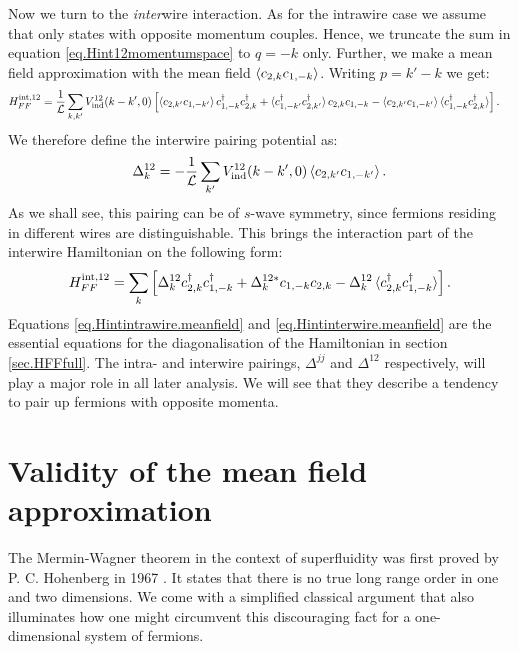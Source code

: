 Now we turn to the \textit{inter}wire interaction. As for the intrawire case we assume that only states with opposite momentum couples. Hence, we truncate the sum in equation \eqref{eq.Hint12momentumspace} to $q = -k$ only. Further, we make a mean field approximation with the mean field $\braket{c_{2,k}c_{1,-k}}$. Writing $p = k' - k$ we get:
\begin{align}
H^\text{int,12}_{FF} = \frac{1}{\mathcal{L}} \sum_{k,k'} V_{\text{ind}}^{12}(k - k',0) & \left[\braket{c_{2,k'}c_{1,-k'}}c^\dagger_{1,-k}c^\dagger_{2,k} + \braket{c^\dagger_{1,-k'}c^\dagger_{2,k'}}c_{2,k}c_{1,-k} - \braket{c_{2,k'}c_{1,-k'}}\braket{c^\dagger_{1,-k}c^\dagger_{2,k}} \right]. \nonumber
\end{align}
We therefore define the interwire pairing potential as:
\begin{equation}
\Delta^{12}_k = -\frac{1}{\mathcal{L}} \sum_{k'} V_{\text{ind}}^{12}(k - k',0)\braket{c_{2,k'}c_{1,-k'}}.
\label{eq.interwirepairingpotentialdef}
\end{equation}
As we shall see, this pairing can be of $s$-wave symmetry, since fermions residing in different wires are distinguishable. This brings the interaction part of the interwire Hamiltonian on the following form:
\begin{equation}
H^\text{int,12}_{FF} = \sum_{k} \left[\Delta^{12}_k c^\dagger_{2,k}c^\dagger_{1,-k} + \Delta^{12 *}_k c_{1,-k}c_{2,k} - \Delta^{12}_k\braket{c^\dagger_{2,k}c^\dagger_{1,-k}} \right].
\label{eq.Hintinterwire.meanfield}
\end{equation}
Equations \ref{eq.Hintintrawire.meanfield} and \ref{eq.Hintinterwire.meanfield} are the essential equations for the diagonalisation of the Hamiltonian in section \ref{sec.HFFfull}. The intra- and interwire pairings, $\Delta^{jj}$ and $\Delta^{12}$ respectively, will play a major role in all later analysis. We will see that they describe a tendency to pair up fermions with opposite momenta. 

\section{Validity of the mean field approximation} \label{sec.meanfieldvalidity}
The Mermin-Wagner theorem in the context of superfluidity was first proved by P. C. Hohenberg in 1967 \cite{Hohenberg.MerminWagnertheorem}. It states that there is no true long range order in one and two dimensions. We come with a simplified classical argument that also illuminates how one might circumvent this discouraging fact for a one-dimensional system of fermions. 

